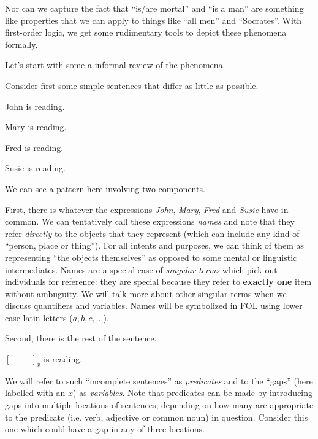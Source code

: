 Nor can we capture the fact that ``is/are mortal'' and ``is a man'' are
something like properties that we can apply to things like ``all men'' and
``Socrates''. With first-order logic, we get some rudimentary tools to depict
these phenomena formally.

Let's start with some a informal review of the phenomena.

Consider first some simple sentences that differ as little as possible.

\begin{argument}
\item[ ] John is reading.
\item[ ] Mary is reading.
\item[ ] Fred is reading.
\item[ ] Susie is reading.
\end{argument}

We can see a pattern here involving two components.

First, there is whatever the expressions \emph{John}, \emph{Mary}, \emph{Fred}
and \emph{Susie} have in common. We can tentatively call these expressions
\emph{names} and note that they refer \emph{directly} to the objects that they
represent (which can include any kind of ``person, place or thing''). For all
intents and purposes, we can think of them as representing ``the objects
themselves'' as opposed to some mental or linguistic intermediates. Names are a
special case of \emph{singular terms} which pick out individuals for reference:
they are special because they refer to \textbf{exactly one} item without
ambuguity. We will talk more about other singular terms when we discuss
quantifiers and variables. Names will be symbolized in FOL using lower case
latin letters ($a,b,c,\dots$).

Second, there is the rest of the sentence.

\begin{argument}
\item[ ] $[\hspace{1cm}]_x$ is reading.
\end{argument}

We will refer to such ``incomplete sentences'' as \emph{predicates} and to the
``gaps'' (here labelled with an $x$) as \emph{variables}. Note that predicates
can be made by introducing gaps into multiple locations of sentences, depending
on how many are appropriate to the predicate (i.e. verb, adjective or common
noun) in question. Consider this one which could have a gap in any of three
locations.

